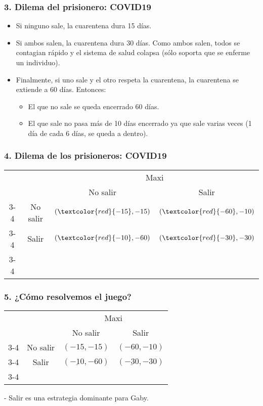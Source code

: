 \documentclass[14pt]{beamer}
\begin{document}
\begin{frame}
\frametitle{3. Dilema del prisionero: COVID19}
\begin{itemize}
\item Si ninguno sale, la cuarentena dura 15 días. 
\item Si ambos salen, la cuarentena dura 30 días. Como ambos salen, todos se contagian rápido y el sistema de salud colapsa (sólo soporta que se enferme un individuo). 
\item Finalmente, si uno sale y el otro respeta la cuarentena, la cuarentena se extiende a 60 días. Entonces:
\begin{itemize}
    \item El que no sale se queda encerrado 60 días.
    \item El que sale no pasa más de 10 días encerrado ya que sale varias veces (1 día de cada 6 días, se queda a dentro).
\end{itemize}
\end{itemize}
\end{frame}

\begin{frame}
\frametitle{4. Dilema de los prisioneros: COVID19}
\begin{table}
     \begin{tabular}{cc|c|c|}
      & \multicolumn{1}{c}{} & \multicolumn{2}{c}{Maxi}\\
      & \multicolumn{1}{c}{} & \multicolumn{1}{c}{No salir}  & \multicolumn{1}{c}{Salir} \\\cline{3-4}
      \multirow{}{\textcolor{red}{Gaby}}  & No salir & $(\textcolor{red}{-15},-15)$ & $(\textcolor{red}{-60},-10)$ \\\cline{3-4}
      & Salir & $(\textcolor{red}{-10},-60)$ & $(\textcolor{red}{-30},-30)$ \\\cline{3-4}
    \end{tabular}
  \end{table}
\end{frame}

\begin{frame}
\frametitle{5. ¿Cómo resolvemos el juego?}
\begin{table}
     \begin{tabular}{cc|c|c|}
      & \multicolumn{1}{c}{} & \multicolumn{2}{c}{Maxi}\\
      & \multicolumn{1}{c}{} & \multicolumn{1}{c}{No salir}  & \multicolumn{1}{c}{Salir} \\\cline{3-4}
      \multirow{}{Gaby}  & No salir & $(-15,-15)$ & $(-60,-10)$ \\\cline{3-4}
      & Salir & $(\underline{-10},-60)$ & $(\underline{-30},-30)$ \\\cline{3-4}
    \end{tabular}
  \end{table}
  - Salir es una estrategia dominante para Gaby. \\
  \end{frame}
\end{document}
